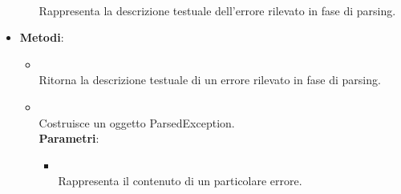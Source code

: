 \begin{itemize}
\begin{itemize}
\\ Rappresenta la descrizione testuale dell'errore rilevato in fase di parsing.
\end{itemize}
\item \textbf{Metodi}:
\begin{itemize}
\item {}
\\ Ritorna la descrizione testuale di un errore rilevato in fase di parsing.
\item {}
\\ Costruisce un oggetto ParsedException.
\\ \textbf{Parametri}:
\begin{itemize}
\item {}
\\ Rappresenta il contenuto di un particolare errore.
\end{itemize}
\end{itemize}
\end{itemize}

